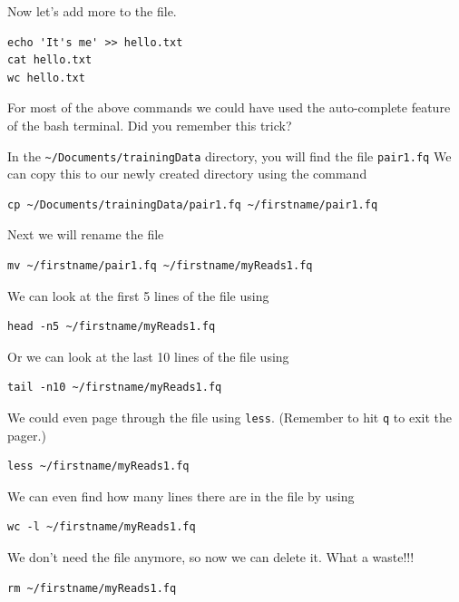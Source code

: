 \begin{steps}
Now let's add more to the file.
\begin{lstlisting}
echo 'It's me' >> hello.txt
cat hello.txt
wc hello.txt
\end{lstlisting}
\end{steps}

\begin{note}
For most of the above commands we could have used the auto-complete feature of the bash terminal.
Did you remember this trick?
\end{note}

\begin{steps}
In the \texttt{\~{}/Documents/trainingData} directory, you will find the file \texttt{pair1.fq}
We can copy this to our newly created directory using the command \\
\begin{lstlisting}
cp ~/Documents/trainingData/pair1.fq ~/firstname/pair1.fq
\end{lstlisting}

Next we will rename the file \\
\begin{lstlisting}
mv ~/firstname/pair1.fq ~/firstname/myReads1.fq
\end{lstlisting}

We can look at the first 5 lines of the file using \\
\begin{lstlisting}
head -n5 ~/firstname/myReads1.fq
\end{lstlisting}

Or we can look at the last 10 lines of the file using \\
\begin{lstlisting}
tail -n10 ~/firstname/myReads1.fq
\end{lstlisting}

We could even page through the file using \texttt{less}.
(Remember to hit \texttt{q} to exit the pager.)\\
\begin{lstlisting}
less ~/firstname/myReads1.fq
\end{lstlisting}

We can even find how many lines there are in the file by using \\
\begin{lstlisting}
wc -l ~/firstname/myReads1.fq
\end{lstlisting}

We don't need the file anymore, so now we can delete it.
What a waste!!!
\begin{lstlisting}
rm ~/firstname/myReads1.fq
\end{lstlisting}

\end{steps}

